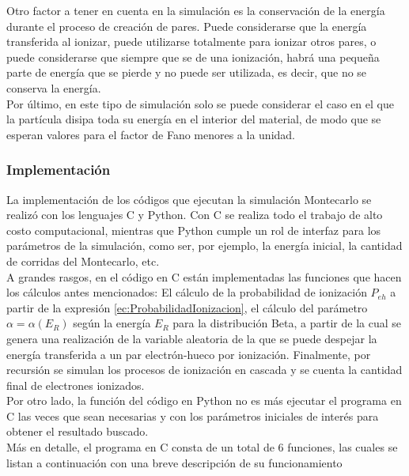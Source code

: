 \indent Otro factor a tener en cuenta en la simulación es la conservación de la energía durante el proceso de creación de pares. Puede considerarse que la energía transferida al ionizar, puede utilizarse totalmente para ionizar otros pares, o puede considerarse que siempre que se de una ionización, habrá una pequeña parte de energía que se pierde y no puede ser utilizada, es decir, que no se conserva la energía.\\
\indent Por último, en este tipo de simulación solo se puede considerar el caso en el que la partícula disipa toda su energía en el interior del material, de modo que se esperan valores para el factor de Fano menores a la unidad.

\subsubsection{Implementación}
\noindent La implementación de los códigos que ejecutan la simulación Montecarlo se realizó con los lenguajes C y Python. Con C se realiza todo el trabajo de alto costo computacional, mientras que Python cumple un rol de interfaz para los parámetros de la simulación, como ser, por ejemplo, la energía inicial, la cantidad de corridas del Montecarlo, etc.\\
\indent A grandes rasgos, en el código en C están implementadas las funciones que hacen los cálculos antes mencionados: El cálculo de la probabilidad de ionización $P_{eh}$ a partir de la expresión \eqref{ec:ProbabilidadIonizacion}, el cálculo del parámetro $\alpha = \alpha(E_{R})$ según la energía $E_{R}$ para la distribución Beta, a partir de la cual se genera una realización de la variable aleatoria de la que se puede despejar la energía transferida a un par electrón-hueco por ionización. Finalmente, por recursión se simulan los procesos de ionización en cascada y se cuenta la cantidad final de electrones ionizados.\\
\indent Por otro lado, la función del código en Python no es más ejecutar el programa en C las veces que sean necesarias y con los parámetros iniciales de interés para obtener el resultado buscado.\\
\indent Más en detalle, el programa en C consta de un total de $6$ funciones, las cuales se listan a continuación con una breve descripción de su funcionamiento
